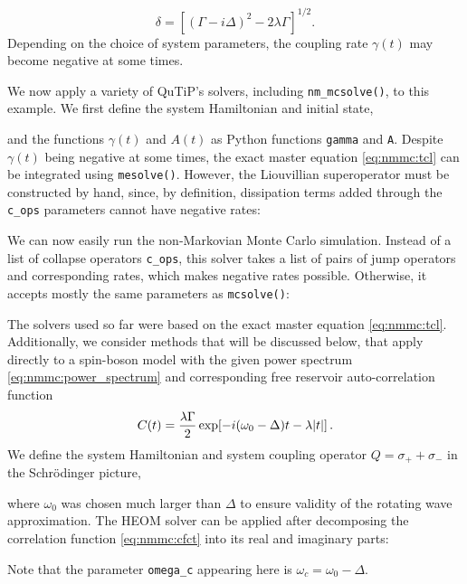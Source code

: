 \documentclass[preprint,3p,sort&compress]{elsarticle}
\def\code#1{\texttt{#1}}
\begin{document}
\begin{equation}
    \delta = [(\Gamma - i\Delta)^2 - 2\lambda\Gamma]^{1/2}.
\end{equation}
Depending on the choice of system parameters, the coupling rate $\gamma(t)$ may become negative at some times.

We now apply a variety of QuTiP's solvers, including \code{nm\_mcsolve()}, to this example.
We first define the system Hamiltonian and initial state,

%
and the functions $\gamma(t)$ and $A(t)$ as Python functions \code{gamma} and \code{A}.
Despite $\gamma(t)$ being negative at some times, the exact master equation \eqref{eq:nmmc:tcl} can be integrated using \code{mesolve()}.
However, the Liouvillian superoperator must be constructed by hand, since, by definition, dissipation terms added through the \code{c\_ops} parameters cannot have negative rates:


We can now easily run the non-Markovian Monte Carlo simulation.
Instead of a list of collapse operators \code{c\_ops}, this solver takes a list of pairs of jump operators and corresponding rates, which makes negative rates possible.
Otherwise, it accepts mostly the same parameters as \code{mcsolve()}:


The solvers used so far were based on the exact master equation \eqref{eq:nmmc:tcl}.
Additionally, we consider methods that will be discussed below, that apply directly to a spin-boson model with the given power spectrum \eqref{eq:nmmc:power_spectrum} and corresponding free reservoir auto-correlation function
\begin{equation} \label{eq:nmmc:cfct}
    C(t) = \frac{\lambda \Gamma}{2} \exp[-i (\omega_0 - \Delta) t - \lambda \abs{t}] \, .
\end{equation}
We define the system Hamiltonian and system coupling operator $Q = \sigma_+ + \sigma_-$ in the Schrödinger picture,

%
where $\omega_0$ was chosen much larger than $\Delta$ to ensure validity of the rotating wave approximation.
The HEOM solver can be applied after decomposing the correlation function \eqref{eq:nmmc:cfct} into its real and imaginary parts:

%
Note that the parameter \code{omega\_c} appearing here is $\omega_c = \omega_0 - \Delta$.
\end{document}
